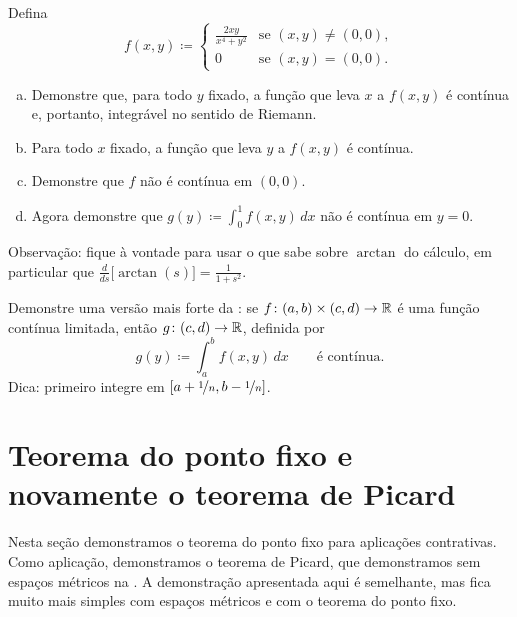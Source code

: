 \begin{exercise}
Defina
\begin{equation*}
f(x,y) \coloneqq
\begin{cases}
\frac{2xy}{x^4+y^2} & \text{se } (x,y) \neq (0,0), \\
0 & \text{se } (x,y) = (0,0) .
\end{cases}
\end{equation*}
\begin{enumerate}[a)]
\item
Demonstre que, para todo $y$ fixado, a função que leva $x$ a $f(x,y)$
é contínua e, portanto, integrável no sentido de Riemann.
\item
Para todo $x$ fixado, a função que leva $y$ a $f(x,y)$ é contínua.
\item
Demonstre que $f$ não é contínua em $(0,0)$.
\item
Agora demonstre que $g(y) \coloneqq \int_0^1 f(x,y)\,dx$ não é contínua em $y=0$.
\end{enumerate}
Observação: fique à vontade para usar o que sabe sobre $\arctan$ do cálculo,
em particular que $\frac{d}{ds} \bigl[ \arctan(s) \bigr] = \frac{1}{1+s^2}$.
\end{exercise}

\begin{exercise} \label{exercise:integralcontcontextra}
Demonstre uma versão mais forte da :
se $f \colon (a,b) \times (c,d) \to {\mathbb{R}}$ é uma função contínua limitada,
então $g \colon (c,d) \to {\mathbb{R}}$, definida por
\begin{equation*}
g(y) \coloneqq \int_a^b f(x,y) \,dx  \qquad \text{é contínua}.
\end{equation*}
Dica: primeiro integre em $[a+\nicefrac{1}{n},b-\nicefrac{1}{n}]$.
\end{exercise}


\sectionnewpage
\section{Teorema do ponto fixo e novamente o teorema de Picard}
\label{sec:metpicard}



Nesta seção demonstramos o teorema do ponto fixo para
aplicações contrativas. Como aplicação, demonstramos o teorema de Picard,
que demonstramos sem espaços métricos na .
A demonstração apresentada aqui é semelhante, mas fica muito
mais simples com espaços métricos e com o teorema do ponto fixo.

